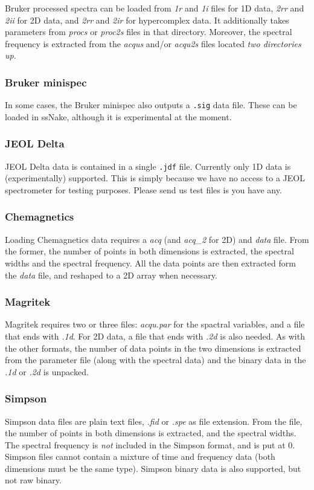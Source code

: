 \documentclass[11pt,a4paper]{article}
\begin{document}
Bruker processed spectra can be loaded from \textit{1r} and \textit{1i} files for 1D data, \textit{2rr} and \textit{2ii} for 2D data, and \textit{2rr} and \textit{2ir} for hypercomplex data. It additionally takes parameters from \textit{procs} or \textit{proc2s} files in that directory. Moreover, the spectral frequency is extracted from the \textit{acqus} and/or \textit{acqu2s} files located \textit{two directories up}.

\subsubsection*{Bruker minispec}
In some cases, the Bruker minispec also outputs a \texttt{.sig} data file. These can be loaded in ssNake, although it is experimental at the moment.
 
\subsubsection*{JEOL Delta}
JEOL Delta data is contained in a single \texttt{.jdf} file. Currently only 1D data is (experimentally) supported. This is simply because we have no access to a JEOL spectrometer for testing purposes. Please send us test files is you have any.

\subsubsection*{Chemagnetics}
Loading Chemagnetics data requires a \textit{acq} (and \textit{acq\_2} for 2D) and \textit{data} file. From the former, the number of points in both dimensions is extracted, the spectral widths and the spectral frequency. All the data points are then extracted form the \textit{data} file, and reshaped to a 2D array when necessary.

\subsubsection*{Magritek}
Magritek requires two or three files: \textit{acqu.par} for the spactral variables, and a file that ends with \textit{.1d}. For 2D data, a file that ends with \textit{.2d} is also needed. As with the other formats, the number of data points in the two dimensions is extracted from the parameter file (along with the spectral data) and the binary data in the \textit{.1d} or \textit{.2d} is unpacked.

\subsubsection*{Simpson}
Simpson data files are plain text files, \textit{.fid} or \textit{.spe} as file extension. From the file, the number of points in both dimensions is extracted, and the spectral widths. The spectral frequency is \textit{not} included in the Simpson format, and is put at 0. Simpson files cannot contain a mixture of time and frequency data (both dimensions must be the same type). Simpson binary data is also supported, but not raw binary.
\end{document}
